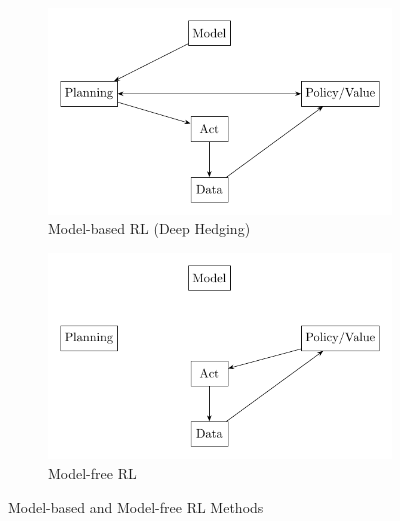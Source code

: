 \begin{figure}[ht!]
    \centering
    \begin{subfigure}{0.45\textwidth}
        \includegraphics[width=\textwidth]{./project3/tikz/modelBased.pdf}
        \caption{Model-based RL (Deep Hedging)}
        \label{subfig3:mbRL}
    \end{subfigure}
    \hspace{1cm}
    \begin{subfigure}{0.45\textwidth}
        \includegraphics[width=\textwidth]{./project3/tikz/modelFree.pdf}
        \caption{Model-free RL}
        \label{subfig3:mfRL}
    \end{subfigure}
    \caption{Model-based and Model-free RL Methods}
    \label{fig3:RLMethods}
\end{figure}

